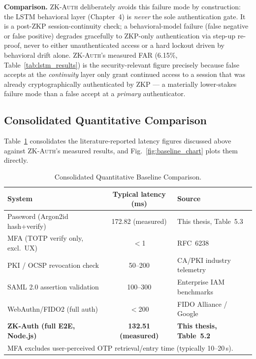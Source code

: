 \documentclass[12pt,a4paper,oneside]{report}
\begin{document}
\textbf{Comparison.} \textsc{ZK-Auth} deliberately avoids this failure
mode by construction: the LSTM behavioral layer (Chapter~4) is
\textit{never} the sole authentication gate. It is a post-ZKP
session-continuity check; a behavioral-model failure (false negative or
false positive) degrades gracefully to ZKP-only authentication via
step-up re-proof, never to either unauthenticated access or a hard
lockout driven by behavioral drift alone. \textsc{ZK-Auth}'s measured
FAR (6.15\%, Table~\ref{tab:lstm_results}) is the security-relevant
figure precisely because false accepts at the \textit{continuity} layer
only grant continued access to a session that was already cryptographically
authenticated by ZKP --- a materially lower-stakes failure mode than a
false accept at a \textit{primary} authenticator.

\subsection{Consolidated Quantitative Comparison}

Table~\ref{tab:baseline_quant} consolidates the literature-reported
latency figures discussed above against \textsc{ZK-Auth}'s measured
results, and Fig.~\ref{fig:baseline_chart} plots them directly.

\begin{table}[htbp]
\renewcommand{\arraystretch}{1.25}
\caption{Consolidated Quantitative Baseline Comparison.}
\label{tab:baseline_quant}
\centering
\footnotesize
\begin{tabular}{lcl}
\toprule
\textbf{System} & \textbf{Typical latency (ms)} & \textbf{Source} \\
\midrule
Password (Argon2id hash+verify) & 172.82 (measured) & This thesis, Table~5.3 \\
MFA (TOTP verify only, excl.\ UX) & $<$1 & RFC~6238 \\
PKI / OCSP revocation check       & 50--200 & CA/PKI industry telemetry \\
SAML 2.0 assertion validation     & 100--300 & Enterprise IAM benchmarks \\
WebAuthn/FIDO2 (full auth)        & $<$200 & FIDO Alliance / Google \\
\textbf{ZK-Auth (full E2E, Node.js)} & \textbf{132.51 (measured)} & \textbf{This thesis, Table~5.2} \\
\bottomrule
\multicolumn{3}{l}{\footnotesize MFA excludes user-perceived OTP retrieval/entry time (typically 10--20\,s).}\\
\end{tabular}
\end{table}
\end{document}
